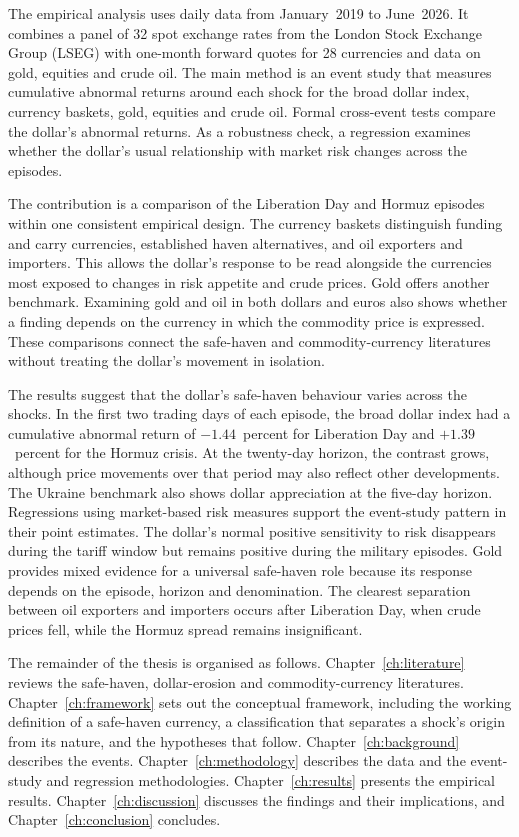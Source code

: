 The empirical analysis uses daily data from January~2019 to June~2026. It combines a panel of 32 spot exchange rates from the London Stock Exchange Group (LSEG) with one-month forward quotes for 28 currencies and data on gold, equities and crude oil. The main method is an event study that measures cumulative abnormal returns around each shock for the broad dollar index, currency baskets, gold, equities and crude oil. Formal cross-event tests compare the dollar's abnormal returns. As a robustness check, a regression examines whether the dollar's usual relationship with market risk changes across the episodes.

The contribution is a comparison of the Liberation Day and Hormuz episodes within one consistent empirical design. The currency baskets distinguish funding and carry currencies, established haven alternatives, and oil exporters and importers. This allows the dollar's response to be read alongside the currencies most exposed to changes in risk appetite and crude prices. Gold offers another benchmark. Examining gold and oil in both dollars and euros also shows whether a finding depends on the currency in which the commodity price is expressed. These comparisons connect the safe-haven and commodity-currency literatures without treating the dollar's movement in isolation.

The results suggest that the dollar's safe-haven behaviour varies across the shocks. In the first two trading days of each episode, the broad dollar index had a cumulative abnormal return of $-1.44$~percent for Liberation Day and $+1.39$~percent for the Hormuz crisis. At the twenty-day horizon, the contrast grows, although price movements over that period may also reflect other developments. The Ukraine benchmark also shows dollar appreciation at the five-day horizon. Regressions using market-based risk measures support the event-study pattern in their point estimates. The dollar's normal positive sensitivity to risk disappears during the tariff window but remains positive during the military episodes. Gold provides mixed evidence for a universal safe-haven role because its response depends on the episode, horizon and denomination. The clearest separation between oil exporters and importers occurs after Liberation Day, when crude prices fell, while the Hormuz spread remains insignificant.

The remainder of the thesis is organised as follows. Chapter~\ref{ch:literature} reviews the safe-haven, dollar-erosion and commodity-currency literatures. Chapter~\ref{ch:framework} sets out the conceptual framework, including the working definition of a safe-haven currency, a classification that separates a shock's origin from its nature, and the hypotheses that follow. Chapter~\ref{ch:background} describes the events. Chapter~\ref{ch:methodology} describes the data and the event-study and regression methodologies. Chapter~\ref{ch:results} presents the empirical results. Chapter~\ref{ch:discussion} discusses the findings and their implications, and Chapter~\ref{ch:conclusion} concludes.

